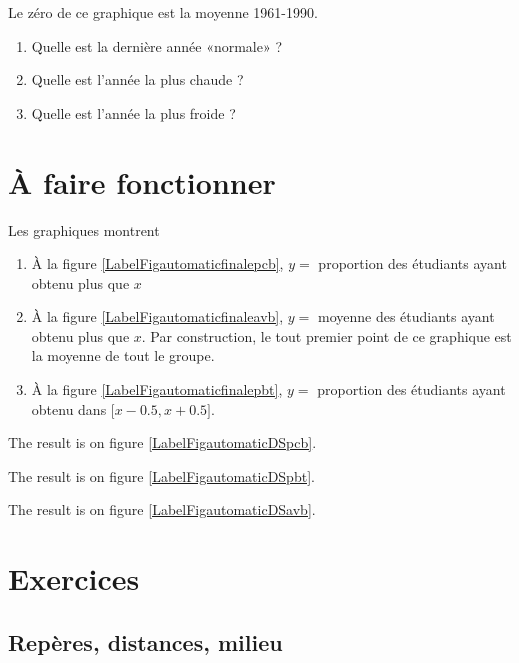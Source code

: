 Le zéro de ce graphique est la moyenne 1961-1990.

\begin{enumerate}
    \item
        Quelle est la dernière année «normale» ?
    \item
        Quelle est l'année la plus chaude ?
    \item
        Quelle est l'année la plus froide ?
\end{enumerate}

\chapter{À faire fonctionner}

Les graphiques montrent
\begin{enumerate}
    \item

        À la figure \ref{LabelFigautomaticfinalepcb}, \( y=\) proportion des étudiants ayant obtenu plus que \( x\)
    \item
        À la figure \ref{LabelFigautomaticfinaleavb}, \( y=\) moyenne des étudiants ayant obtenu plus que \( x\). Par construction, le tout premier point de ce graphique est la moyenne de tout le groupe.
    \item
        À la figure \ref{LabelFigautomaticfinalepbt}, \( y=\) proportion des étudiants ayant obtenu dans \( \mathopen[ x-0.5 , x+0.5 \mathclose]\).
\end{enumerate}

The result is on figure \ref{LabelFigautomaticDSpcb}.
\newcommand{\CaptionFigautomaticDSpcb}{<+Type your caption here+>}


The result is on figure \ref{LabelFigautomaticDSpbt}.
\newcommand{\CaptionFigautomaticDSpbt}{<+Type your caption here+>}


The result is on figure \ref{LabelFigautomaticDSavb}.
\newcommand{\CaptionFigautomaticDSavb}{<+Type your caption here+>}



\chapter{Exercices}

\section{Repères, distances, milieu}

